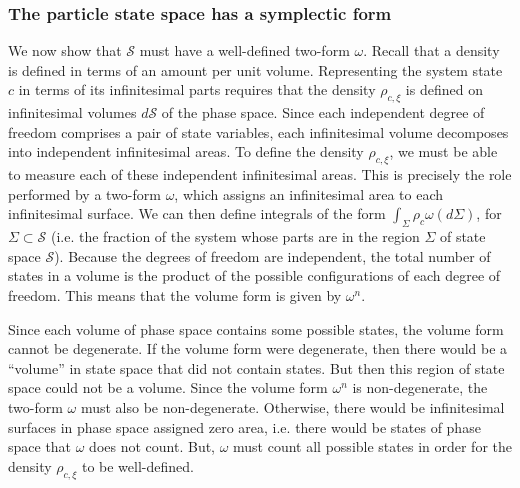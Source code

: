 \documentclass[12pt, english, twoside]{article} %
\begin{document}
\subsubsection{The particle state space has a symplectic form}

We now show that $\mathcal{S}$ must have a well-defined two-form $\omega$. Recall that a density is defined in terms of an amount per unit volume. Representing the system state $c$ in terms of its infinitesimal parts requires that the density $\rho_{c, \xi} $ is defined on infinitesimal volumes $d \mathcal{S}$ of the phase space. Since each independent degree of freedom comprises a pair of state variables, each infinitesimal volume decomposes into independent infinitesimal areas. To define the density $\rho_{c, \xi} $, we must be able to measure each of these independent infinitesimal areas. This is precisely the role performed by a two-form $\omega$, which assigns an infinitesimal area to each infinitesimal surface. We can then define integrals of the form $\int_{\Sigma} \rho_c \omega(d\Sigma)$, for $\Sigma \subset \mathcal{S}$ (i.e. the fraction of the system whose parts are in the region $\Sigma$ of state space $\mathcal{S}$). Because the degrees of freedom are independent, the total number of states in a volume is the product of the possible configurations of each degree of freedom. This means that the volume form is given by $\omega^n$. 

Since each volume of phase space contains some possible states, the volume form cannot be degenerate. If the volume form were degenerate, then there would be a ``volume'' in state space that did not contain states. But then this region of state space could not be a volume. Since the volume form $\omega^n$ is non-degenerate, the two-form $\omega$ must also be non-degenerate. Otherwise, there would be infinitesimal surfaces in phase space assigned zero area, i.e. there would be states of phase space that $\omega$ does not count. But, $\omega$ must count all possible states in order for the density $\rho_{c, \xi} $ to be well-defined.


\end{document}
